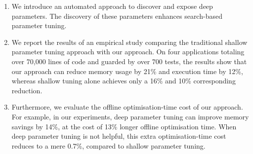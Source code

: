 \begin{enumerate}

\item We introduce an automated approach to discover and expose deep
parameters. The discovery of these parameters enhances search-based parameter tuning.

\item We report the results of an empirical study comparing the traditional shallow parameter tuning approach with our approach. On four applications totaling over 70,000 lines of code and guarded by over 700 tests, the results show that our approach can reduce memory usage by 21\% and execution time by 12\%, whereas shallow tuning alone achieves only a 16\% and 10\% corresponding reduction. 

\item Furthermore, we evaluate the offline optimisation-time cost of our
approach. For example, in our experiments, deep parameter tuning can
improve memory savings by 14\%, at the cost of 13\% longer 
offline optimisation time. When deep parameter tuning is not helpful, this
extra optimisation-time cost reduces to a mere 0.7\%, compared to shallow
parameter tuning.  

\end{enumerate}



